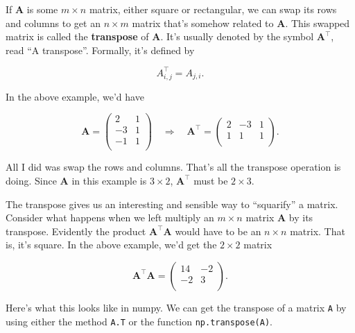 \documentclass[
  letterpaper,
  DIV=11,
  numbers=noendperiod]{scrreprt}
\begin{document}
If \(\mathbf{A}\) is some \(m \times n\) matrix, either square or
rectangular, we can swap its rows and columns to get an \(n \times m\)
matrix that's somehow related to \(\mathbf{A}\). This swapped matrix is
called the \textbf{transpose} of \(\mathbf{A}\). It's usually denoted by
the symbol \(\mathbf{A}^\top\), read ``A transpose''. Formally, it's
defined by

\[A_{i,j}^\top = A_{j,i}.\]

In the above example, we'd have

\[
\mathbf{A} = 
\begin{pmatrix}
2 & 1 \\
-3 & 1 \\
-1 & 1 \\
\end{pmatrix} \quad \Longrightarrow \quad
\mathbf{A}^\top = 
\begin{pmatrix}
2 & -3 & 1 \\
1 & 1 & 1 \\
\end{pmatrix}.
\]

All I did was swap the rows and columns. That's all the transpose
operation is doing. Since \(\mathbf{A}\) in this example is
\(3 \times 2\), \(\mathbf{A}^\top\) must be \(2 \times 3\).

The transpose gives us an interesting and sensible way to ``squarify'' a
matrix. Consider what happens when we left multiply an \(m \times n\)
matrix \(\mathbf{A}\) by its transpose. Evidently the product
\(\mathbf{A}^\top \mathbf{A}\) would have to be an \(n \times n\)
matrix. That is, it's square. In the above example, we'd get the
\(2 \times 2\) matrix

\[
\mathbf{A}^\top \mathbf{A} = 
\begin{pmatrix}
14 & -2 \\
-2 & 3 \\
\end{pmatrix}.
\]

Here's what this looks like in numpy. We can get the transpose of a
matrix \texttt{A} by using either the method \texttt{A.T} or the
function \texttt{np.transpose(A)}.
\end{document}
